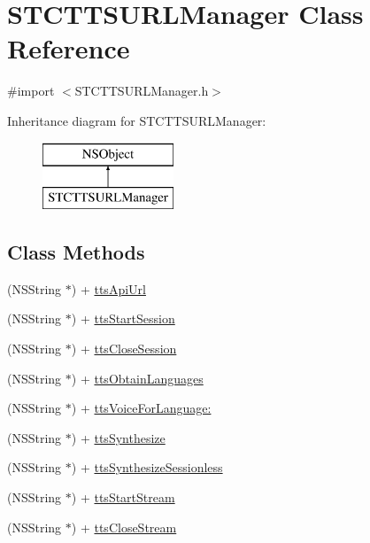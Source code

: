 \hypertarget{interface_s_t_c_t_t_s_u_r_l_manager}{}\section{S\+T\+C\+T\+T\+S\+U\+R\+L\+Manager Class Reference}
\label{interface_s_t_c_t_t_s_u_r_l_manager}


{\ttfamily \#import $<$S\+T\+C\+T\+T\+S\+U\+R\+L\+Manager.\+h$>$}

Inheritance diagram for S\+T\+C\+T\+T\+S\+U\+R\+L\+Manager\+:\begin{figure}[H]
\begin{center}
\leavevmode
\includegraphics[height=2.000000cm]{interface_s_t_c_t_t_s_u_r_l_manager}
\end{center}
\end{figure}
\subsection*{Class Methods}
\begin{DoxyCompactItemize}
\item 
(N\+S\+String $\ast$) + \hyperlink{interface_s_t_c_t_t_s_u_r_l_manager_a35109e921ad45728ec11306001c520e8}{tts\+Api\+Url}
\item 
(N\+S\+String $\ast$) + \hyperlink{interface_s_t_c_t_t_s_u_r_l_manager_ad7252dc739035543112f9aa103f8246e}{tts\+Start\+Session}
\item 
(N\+S\+String $\ast$) + \hyperlink{interface_s_t_c_t_t_s_u_r_l_manager_ac3165e245d749f97fce2fe5f4bca3b77}{tts\+Close\+Session}
\item 
(N\+S\+String $\ast$) + \hyperlink{interface_s_t_c_t_t_s_u_r_l_manager_ac991b76d587aff41952f35f4d5a701a3}{tts\+Obtain\+Languages}
\item 
(N\+S\+String $\ast$) + \hyperlink{interface_s_t_c_t_t_s_u_r_l_manager_a11a3d86de1b21ab5d4697994021b1ac5}{tts\+Voice\+For\+Language\+:}
\item 
(N\+S\+String $\ast$) + \hyperlink{interface_s_t_c_t_t_s_u_r_l_manager_a6fa3054433c0e2b4d3c5d2e788dcd018}{tts\+Synthesize}
\item 
(N\+S\+String $\ast$) + \hyperlink{interface_s_t_c_t_t_s_u_r_l_manager_a9beb9bd59e7012c1e839cbe752d3304f}{tts\+Synthesize\+Sessionless}
\item 
(N\+S\+String $\ast$) + \hyperlink{interface_s_t_c_t_t_s_u_r_l_manager_a334b1d5bf33e254331ed23db43f4a4a1}{tts\+Start\+Stream}
\item 
(N\+S\+String $\ast$) + \hyperlink{interface_s_t_c_t_t_s_u_r_l_manager_a81ae15f31b07c8e2d63cedf2ebfb6f4c}{tts\+Close\+Stream}
\end{DoxyCompactItemize}


